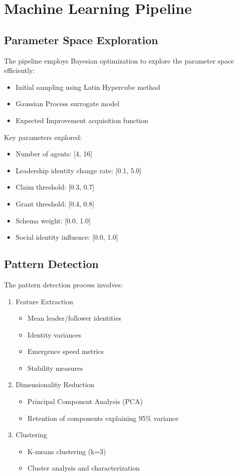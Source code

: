 \documentclass[11pt]{article}
\begin{document}
\section{Machine Learning Pipeline}
\subsection{Parameter Space Exploration}
The pipeline employs Bayesian optimization to explore the parameter space efficiently:

\begin{itemize}
    \item Initial sampling using Latin Hypercube method
    \item Gaussian Process surrogate model
    \item Expected Improvement acquisition function
\end{itemize}

Key parameters explored:
\begin{itemize}
    \item Number of agents: [4, 16]
    \item Leadership identity change rate: [0.1, 5.0]
    \item Claim threshold: [0.3, 0.7]
    \item Grant threshold: [0.4, 0.8]
    \item Schema weight: [0.0, 1.0]
    \item Social identity influence: [0.0, 1.0]
\end{itemize}

\subsection{Pattern Detection}
The pattern detection process involves:

\begin{enumerate}
    \item Feature Extraction
    \begin{itemize}
        \item Mean leader/follower identities
        \item Identity variances
        \item Emergence speed metrics
        \item Stability measures
    \end{itemize}
    
    \item Dimensionality Reduction
    \begin{itemize}
        \item Principal Component Analysis (PCA)
        \item Retention of components explaining 95\% variance
    \end{itemize}
    
    \item Clustering
    \begin{itemize}
        \item K-means clustering (k=3)
        \item Cluster analysis and characterization
    \end{itemize}
\end{enumerate}
\end{document}
